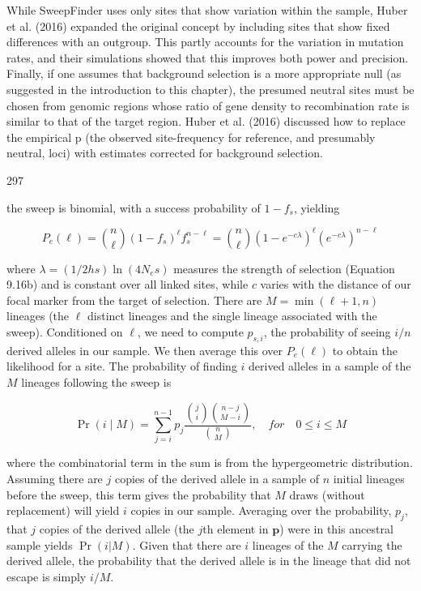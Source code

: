 \documentclass{article}
\begin{document}
While SweepFinder uses only sites that show variation within the sample, Huber et al. (2016) expanded the original concept by including sites that show fixed differences with an outgroup. This partly accounts for the variation in mutation rates, and their simulations showed that this improves both power and precision. Finally, if one assumes that background selection is a more appropriate null (as suggested in the introduction to this chapter), the presumed neutral sites must be chosen from genomic regions whose ratio of gene density to recombination rate is similar to that of the target region. Huber et al. (2016) discussed how to replace the empirical p (the observed site-frequency for reference, and presumably neutral, loci) with estimates corrected for background selection.

297

the sweep is binomial, with a success probability of  $ 1 - f_{s} $, yielding

\begin{equation}
P_{e}(\ell)=\binom{n}{\ell}(1-f_{s})^{\ell}f_{s}^{n-\ell}=\binom{n}{\ell}\left(1-e^{-c\lambda}\right)^{\ell}\left(e^{-c\lambda}\right)^{n-\ell}
\tag{9.18a}
\label{eq:9_18a}
\end{equation}

where  $ \lambda = (1/2hs) \ln(4N_e s) $ measures the strength of selection (Equation 9.16b) and is constant over all linked sites, while  $ c $ varies with the distance of our focal marker from the target of selection. There are  $ M = \min(\ell + 1, n) $ lineages (the  $ \ell $ distinct lineages and the single lineage associated with the sweep). Conditioned on  $ \ell $, we need to compute  $ p_{s,i} $, the probability of seeing  $ i/n $ derived alleles in our sample. We then average this over  $ P_e(\ell) $ to obtain the likelihood for a site. The probability of finding  $ i $ derived alleles in a sample of the  $ M $ lineages following the sweep is

\begin{equation}
\Pr(i\mid M)=\sum_{j=i}^{n-1}p_{j}\frac{\binom{j}{i}\binom{n-j}{M-i}}{\binom{n}{M}},\quad for\quad0\leq i\leq M
\tag{9.18b}
\label{eq:9_18b}
\end{equation}

where the combinatorial term in the sum is from the hypergeometric distribution. Assuming there are $j$ copies of the derived allele in a sample of $n$ initial lineages before the sweep, this term gives the probability that $M$ draws (without replacement) will yield $i$ copies in our sample. Averaging over the probability, $p_{j}$, that $j$ copies of the derived allele (the $j$th element in $\mathbf{p}$) were in this ancestral sample yields $\operatorname{Pr}(i|M)$. Given that there are $i$ lineages of the $M$ carrying the derived allele, the probability that the derived allele is in the lineage that did not escape is simply $i/M$.
\end{document}
